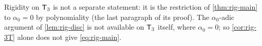 \begin{rmk}
\label{rmk:rig-3Trig}
Rigidity on $\mathsf{T}_{3}$ is not a separate statement: it is the restriction of \cref{thm:rig-main} to $\alpha_0=0$ by polynomiality (the last paragraph of its proof). The $\alpha_0$-adic argument of \cref{lem:rig-disc} is not available on $\mathsf{T}_{3}$ itself, where $\alpha_0=0$; so \cref{cor:rig-3T} alone does not give \eqref{eq:rig-main}.
\end{rmk}
